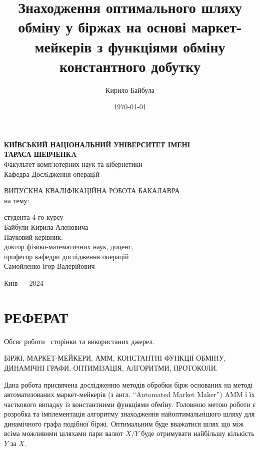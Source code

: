 \documentclass[14pt]{extarticle}
\author{Кирило Байбула}
\date{\today}
\title{Знаходження оптимального шляху обміну у біржах на основі маркет-мейкерів
  з функціями обміну константного добутку}
\begin{document}
\begin{titlepage}
	\begin{center}
		\vspace*{1cm}

		\textbf{КИЇВСЬКИЙ НАЦІОНАЛЬНИЙ УНІВЕРСИТЕТ ІМЕНІ \\ ТАРАСА ШЕВЧЕНКA} \\
		Факультет комп'ютерних наук та кібернетики \\
		Кафедра Дослiдження операцiй

		\vspace{2.0cm}
		ВИПУСКНА КВАЛІФІКАЦІЙНА РОБОТА БАКАЛАВРА \\
		на тему: \\
		\textbf{\THETITLE}
		\vspace{1.5cm}
		\begin{flushright}
			студента 4-го курсу \\
			Байбули Кирила Аленовича \\
			\vspace{2.0cm}
			Науковий керівник: \\
			доктор фізико-математичних наук, доцент, \\
			професор кафедри дослідження операцій \\
			Самойленко Ігор Валерійович
		\end{flushright}

		\vfill

		\vspace{0.8cm}
		Київ ---  2024
	\end{center}
\end{titlepage}
\newpage


\section*{РЕФЕРАТ}\label{sec:abstract}

Обсяг роботи~\ztotpages{} сторінки та  використаних джерел.

БІРЖІ, МАРКЕТ-МЕЙКЕРИ, АММ, КОНСТАНТНІ ФУНКЦІЇ ОБМІНУ, ДИНАМІЧНІ ГРАФИ,
ОПТИМІЗАЦІЯ, АЛГОРИТМИ, ПРОТОКОЛИ.

Дана робота присвячена дослідженню методів обробки бірж основаних на методі
автоматизованих маркет-мейкерів (з англ. ``Automated Market Maker'') AMM і їх
часткового випадку із константними функціями обміну. Головною метою роботи є
розробка та імплементація алгоритму знаходження найоптимальнішого шляху для
динамічного графа подібної біржі. Оптимальним буде вважатися шлях що між всіма
можливими шляхами пари валют $X/Y$ буде отримувати найбільшу кількість $Y$ за
$X$.
\end{document}
